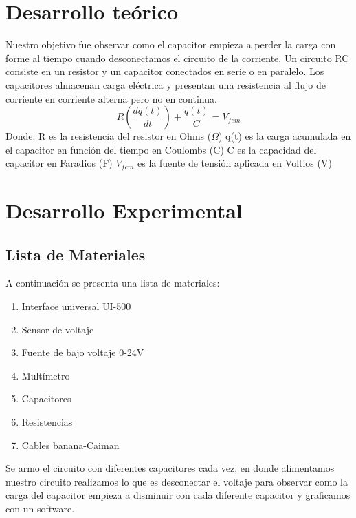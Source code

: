 \documentclass{article}
\begin{document}

\begin{multicols}{2}
\section{Desarrollo teórico}\label{Desarrollo Teorico}                              	%
Nuestro objetivo fue observar como el capacitor empieza a perder la carga con forme al tiempo cuando desconectamos el circuito de la corriente.
\cite{Moebs}
Un circuito RC consiste en un resistor y un capacitor conectados en serie o en paralelo. Los capacitores almacenan carga eléctrica y presentan una resistencia al flujo de corriente en corriente alterna pero no en continua.
\begin{equation}
R\left(\frac{dq(t)}{dt}\right) + \frac{q(t)}{C} = V_{fem}
\end{equation}
Donde:
R es la resistencia del resistor en Ohms ($\Omega$)
q(t) es la carga acumulada en el capacitor en función del tiempo en Coulombs (C)
C es la capacidad del capacitor en Faradios (F)
$V_{fem}$ es la fuente de tensión aplicada en Voltios (V)
\section{Desarrollo Experimental}\label{Desarrollo experimental}				%
\subsection*{Lista de Materiales}
A continuación se presenta una lista de materiales:
\begin{enumerate}
    \item Interface universal UI-500
    \item Sensor de voltaje
    \item Fuente de bajo voltaje 0-24V
    \item Multímetro 
    \item Capacitores 
    \item Resistencias 
    \item Cables banana-Caiman
\end{enumerate}
Se armo el circuito con diferentes capacitores cada vez, en donde alimentamos nuestro circuito realizamos lo que es desconectar
el voltaje para observar como la carga del capacitor empieza a disminuir con cada diferente capacitor y graficamos con un software.
\end{multicols}
\end{document}
